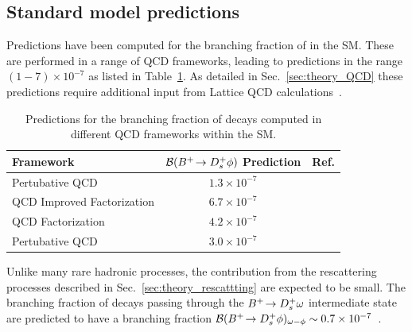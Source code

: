 \subsection{Standard model predictions}
Predictions have been computed for the branching fraction of \decay{\Bp}{\Dsp\phiz} in the SM.  
These are performed in a range of QCD frameworks, leading to predictions in the range $(1-7)\times10^{-7}$ as listed in Table~\ref{tab:theory_predicted_br}. As detailed in Sec.~\ref{sec:theory_QCD} these predictions require additional input from Lattice QCD calculations~\cite{fB:2013HPQCD,fB:2016ETM, fB:2016Fermi}.  
\begin{table}[h]
    \centering
    \begin{tabular}{ l c c }
        \hline
        Framework                      & ${\mathcal{B}}({{{B}^+}}\!\rightarrow {\ensuremath{{D}^+_{s}}}\phi)$ Prediction           & Ref.                       \\
        \hline
        Pertubative QCD                & $1.3\times10^{-7}$    & ~\cite{Zou:2009zza}        \\
        QCD Improved Factorization     & $6.7\times10^{-7}$    & ~\cite{Mohanta:2002wf}     \\
        QCD Factorization              & $4.2\times10^{-7}$    & ~\cite{Mohanta:2007uu}     \\
        Pertubative QCD                & $3.0\times10^{-7}$    & ~\cite{Lu:2001yz}          \\
        \hline 
    \end{tabular}
   \caption{Predictions for the branching fraction of \decay{\Bp}{\Dsp\phiz} decays computed in different QCD frameworks within the SM.}
   \label{tab:theory_predicted_br}
\end{table}

Unlike many rare hadronic processes, the contribution from the rescattering processes described in Sec.~\ref{sec:theory_rescattting} are expected to be small. The branching fraction of decays passing through the ${{{B}^+}}\!\rightarrow {\ensuremath{{D}^+_{s}}}\omega$ intermediate state are predicted to have a branching fraction ${\mathcal{B}}({{{B}^+}}\!\rightarrow {\ensuremath{{D}^+_{s}}}\phi)_{\omega-\phi}\sim 0.7\times10^{-7}$~\cite{Gronau:2012gs}. 



